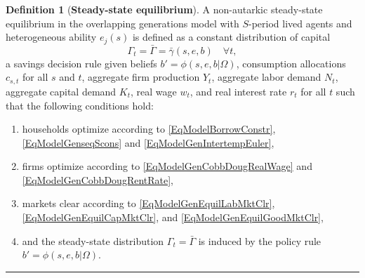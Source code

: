 \documentclass[letterpaper,12pt]{article}
\theoremstyle{definition}
\newtheorem{definition}{Definition} %
\begin{document}
    \begin{definition}[\textbf{Steady-state equilibrium}]\label{DefEquilSS}
      A non-autarkic steady-state equilibrium in the overlapping generations model with $S$-period lived agents and heterogeneous ability $e_j(s)$ is defined as a constant distribution of capital
       \begin{equation*}
          \Gamma_t = \bar{\Gamma}=\bar{\gamma}(s,e,b) \quad \forall t,
       \end{equation*}
       a savings decision rule given beliefs $b' = \phi(s,e,b|\Omega)$, consumption allocations $c_{s,t}$ for all $s$ and $t$, aggregate firm production $Y_t$, aggregate labor demand $N_t$, aggregate capital demand $K_t$, real wage $w_t$, and real interest rate $r_t$ for all $t$ such that the following conditions hold:
       \begin{enumerate}
          \item households optimize according to \eqref{EqModelBorrowConstr}, \eqref{EqModelGenseqScons} and \eqref{EqModelGenIntertempEuler},
          \item firms optimize according to \eqref{EqModelGenCobbDougRealWage} and \eqref{EqModelGenCobbDougRentRate},
          \item markets clear according to \eqref{EqModelGenEquilLabMktClr}, \eqref{EqModelGenEquilCapMktClr}, and \eqref{EqModelGenEquilGoodMktClr},
          \item and the steady-state distribution $\Gamma_t=\bar{\Gamma}$ is induced by the policy rule $b' = \phi(s,e,b|\Omega)$.
       \end{enumerate}
    \end{definition}
    \hrule
\end{document}
